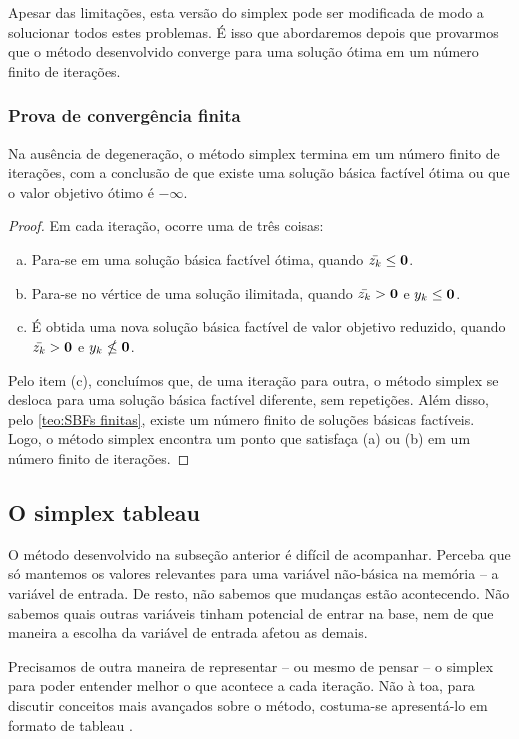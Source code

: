 Apesar das limitações, esta versão do simplex pode ser modificada de modo a solucionar todos estes problemas. É isso que abordaremos depois que provarmos que o método desenvolvido converge para uma solução ótima em um número finito de iterações.

\subsubsection*{Prova de convergência finita}
\begin{theorem}
    Na ausência de degeneração, o método simplex termina em um número finito de iterações, com a conclusão de que existe uma solução básica factível ótima ou que o valor objetivo ótimo é $-\infty$.
\end{theorem}
\begin{proof}
    Em cada iteração, ocorre uma de três coisas:
    \begin{enumerate}[(a)]
        \item Para-se em uma solução básica factível ótima, quando $\bar{ z_k} \leq \vb{0}$.
        \item Para-se no vértice de uma solução ilimitada, quando $\bar{ z_k} > \vb{0}$ e $ y_k \leq \vb 0$.
        \item É obtida uma nova solução básica factível de valor objetivo reduzido, quando $\bar{ z_k} > \vb 0$ e $ y_k \nleq \vb 0$.
    \end{enumerate}
    Pelo item (c), concluímos que, de uma iteração para outra, o método simplex se desloca para uma solução básica factível diferente, sem repetições. Além disso, pelo \cref{teo:SBFs finitas}, existe um número finito de soluções básicas factíveis. Logo, o método simplex encontra um ponto que satisfaça (a) ou (b) em um número finito de iterações. 
\end{proof}

\subsection{O simplex tableau}
O método desenvolvido na subseção anterior é difícil de acompanhar. Perceba que só mantemos os valores relevantes para uma variável não-básica na memória -- a variável de entrada. De resto, não sabemos que mudanças estão acontecendo. Não sabemos quais outras variáveis tinham potencial de entrar na base, nem de que maneira a escolha da variável de entrada afetou as demais.

Precisamos de outra maneira de representar -- ou mesmo de pensar -- o simplex para poder entender melhor o que acontece a cada iteração. Não à toa, para discutir conceitos mais avançados sobre o método, costuma-se apresentá-lo em formato de tableau \cite{BERTSIMAS:97}.

